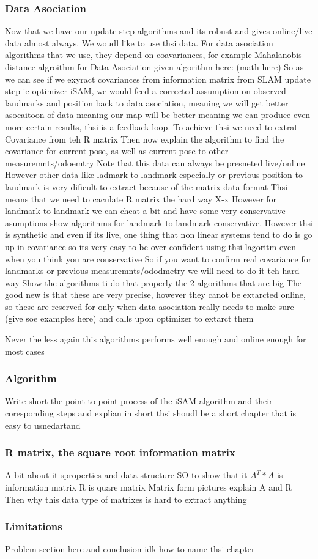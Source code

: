 \subsubsection{Data Asociation}
Now that we have our update step algorithms and its robust and gives online/live data almost always. We woudl like to use thsi data.
For data asociation algorithms that we use, they depend on coavariances, for example  Mahalanobis distance algroithm for Data Asociation given algorithm here: (math here)
So as we can see if we exyract covariances from information matrix from SLAM update step ie optimizer iSAM, we would feed a corrected assumption on observed landmarks and position back to data asociation, meaning we will get better asocaitoon of data meaning our map will be better meaning we can produce even more certain results, thsi is a feedback loop. To achieve thsi we need to extrat Covariance from teh R matrix
Then now explain the algorithm to find the covariance for current pose, as well as current pose to other measuremnts/odoemtry
Note that this data can always be presneted live/online
However other data like ladmark to landmark especially or previous position to landmark is very dificult to extract because of the matrix data format
Thsi means that we need to caculate R matrix the hard way X-x
However for landmark to landmark we can cheat a bit and have some very conservative asumptions show algoritnms for landmark to landmark conservative. However thsi is synthetic and even if its live, one thing that non linear systems tend to do is go up in covariance so its very easy to be over confident using thsi lagoritm even when you think you are conservative
So if you want to confirm real covariance for landmarks or previous measuremnts/ododmetry we will need to do it teh hard way
Show the algorithms ti do that properly the 2 algorithms that are big
The good new is that these are very precise, however they canot be extarcted online, so these are reserved for only when data asociation really needs to make sure (give soe examples here) and calls upon optimizer to extarct them

Never the less again this algorithms performs well enough and online enough for most cases

\subsubsection{Algorithm}
Write short the point to point process of the iSAM algorithm and their coresponding steps and explian in short
thsi shoudl be a short chapter that is easy to usnedartand

\subsubsection{R matrix, the square root information matrix}
A bit about it sproperties and data structure
SO to show that it $A^T*A$ is information matrix
R is quare matrix
Matrix form pictures explain A and R
Then why this data type of matrixes is hard to extract anything

\subsubsection{Limitations}
Problem section here and conclusion idk how to name thsi chapter
